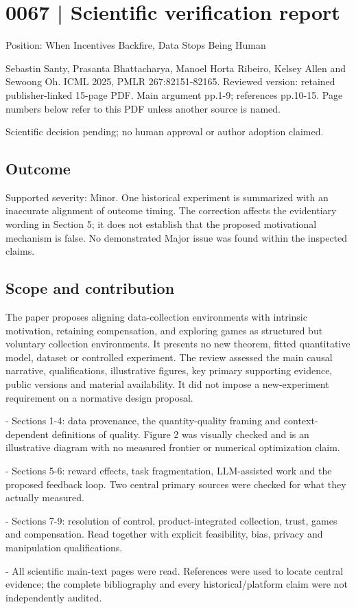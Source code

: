 \documentclass[10pt]{article}
\begin{document}
\section*{0067 | Scientific verification report}
Position: When Incentives Backfire, Data Stops Being Human\par
Sebastin Santy, Prasanta Bhattacharya, Manoel Horta Ribeiro, Kelsey Allen and Sewoong Oh. ICML 2025, PMLR 267:82151-82165. Reviewed version: retained publisher-linked 15-page PDF. Main argument pp.1-9; references pp.10-15. Page numbers below refer to this PDF unless another source is named.\par
Scientific decision pending; no human approval or author adoption claimed.\par
\subsection*{Outcome}
Supported severity: Minor. One historical experiment is summarized with an inaccurate alignment of outcome timing. The correction affects the evidentiary wording in Section 5; it does not establish that the proposed motivational mechanism is false. No demonstrated Major issue was found within the inspected claims.\par
\subsection*{Scope and contribution}
The paper proposes aligning data-collection environments with intrinsic motivation, retaining compensation, and exploring games as structured but voluntary collection environments. It presents no new theorem, fitted quantitative model, dataset or controlled experiment. The review assessed the main causal narrative, qualifications, illustrative figures, key primary supporting evidence, public versions and material availability. It did not impose a new-experiment requirement on a normative design proposal.\par
- Sections 1-4: data provenance, the quantity-quality framing and context-dependent definitions of quality. Figure 2 was visually checked and is an illustrative diagram with no measured frontier or numerical optimization claim.\par
- Sections 5-6: reward effects, task fragmentation, LLM-assisted work and the proposed feedback loop. Two central primary sources were checked for what they actually measured.\par
- Sections 7-9: resolution of control, product-integrated collection, trust, games and compensation. Read together with explicit feasibility, bias, privacy and manipulation qualifications.\par
- All scientific main-text pages were read. References were used to locate central evidence; the complete bibliography and every historical/platform claim were not independently audited.\par
\end{document}

